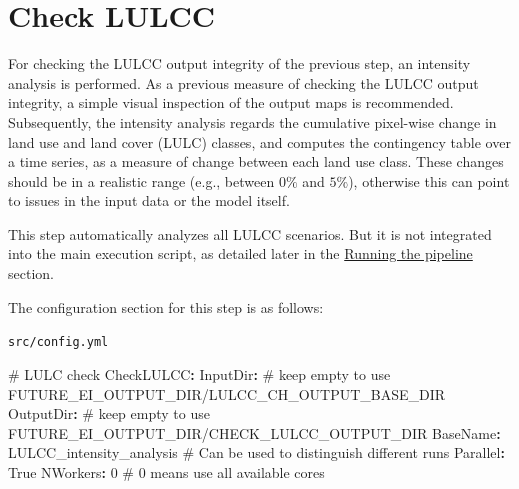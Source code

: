 \documentclass[
  letterpaper,
  DIV=11,
  numbers=noendperiod]{scrreprt}
\newenvironment{Shaded}{\begin{snugshade}}{\end{snugshade}}
\newcommand{\AttributeTok}[1]{\textcolor[rgb]{0.40,0.45,0.13}{#1}}
\newcommand{\CharTok}[1]{\textcolor[rgb]{0.13,0.47,0.30}{#1}}
\newcommand{\CommentTok}[1]{\textcolor[rgb]{0.37,0.37,0.37}{#1}}
\newcommand{\DecValTok}[1]{\textcolor[rgb]{0.68,0.00,0.00}{#1}}
\newcommand{\FunctionTok}[1]{\textcolor[rgb]{0.28,0.35,0.67}{#1}}
\newcommand{\KeywordTok}[1]{\textcolor[rgb]{0.00,0.23,0.31}{\textbf{#1}}}
\newcounter{quartocalloutcauno}
\newcommand{\quartocalloutcau}[1]{\refstepcounter{quartocalloutcauno}\label{#1}}
\begin{document}

\chapter{Check LULCC}\label{11_CheckLULCC}

For checking the LULCC output integrity of the previous step, an
intensity analysis is performed. As a previous measure of checking the
LULCC output integrity, a simple visual inspection of the output maps is
recommended. Subsequently, the intensity analysis regards the cumulative
pixel-wise change in land use and land cover (LULC) classes, and
computes the contingency table over a time series, as a measure of
change between each land use class. These changes should be in a
realistic range (e.g., between \(0\%\) and \(5\%\)), otherwise this can
point to issues in the input data or the model itself.

\begin{tcolorbox}[enhanced jigsaw, breakable, bottomrule=.15mm, toprule=.15mm, rightrule=.15mm, opacitybacktitle=0.6, title=\textcolor{quarto-callout-note-color}{\faInfo}\hspace{0.5em}{Note \ref*{cau-ia}}, coltitle=black, colback=white, titlerule=0mm, toptitle=1mm, left=2mm, bottomtitle=1mm, colbacktitle=quarto-callout-note-color!10!white, colframe=quarto-callout-note-color-frame, opacityback=0, leftrule=.75mm, arc=.35mm]

\quartocalloutcau{cau-ia} 

This step automatically analyzes all LULCC scenarios. But it is not
integrated into the main execution script, as detailed later in the
\href{running.html}{Running the pipeline} section.

\end{tcolorbox}

The configuration section for this step is as follows:

\begin{codelisting}

\caption{\texttt{src/config.yml}}

\begin{Shaded}
\begin{Highlighting}[]
\CommentTok{\# LULC check}
\FunctionTok{CheckLULCC}\KeywordTok{:}
\AttributeTok{  }\FunctionTok{InputDir}\KeywordTok{:}\CommentTok{ \# keep empty to use FUTURE\_EI\_OUTPUT\_DIR/LULCC\_CH\_OUTPUT\_BASE\_DIR}
\AttributeTok{  }\FunctionTok{OutputDir}\KeywordTok{:}\CommentTok{ \# keep empty to use FUTURE\_EI\_OUTPUT\_DIR/CHECK\_LULCC\_OUTPUT\_DIR}
\AttributeTok{  }\FunctionTok{BaseName}\KeywordTok{:}\AttributeTok{ LULCC\_intensity\_analysis}\CommentTok{ \# Can be used to distinguish different runs}
\AttributeTok{  }\FunctionTok{Parallel}\KeywordTok{:}\AttributeTok{ }\CharTok{True}
\AttributeTok{  }\FunctionTok{NWorkers}\KeywordTok{:}\AttributeTok{ }\DecValTok{0}\CommentTok{  \# 0 means use all available cores}
\end{Highlighting}
\end{Shaded}

\end{codelisting}
\end{document}
